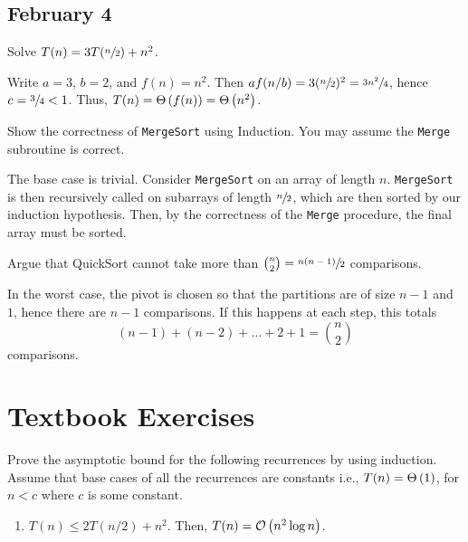 \documentclass[draft]{article}
\begin{document}
\subsection{February 4}
\begin{question}
    Solve $T(n) = 3T(\sfrac{n}{2}) + n^2$.
\end{question}

\begin{solution}
    Write $a = 3$, $b=2$, and $f(n) = n^2$. Then $af(n/b) = 3(\sfrac{n}{2})^2=\sfrac{3n^2}{4}$, hence $c =\sfrac{3}{4} < 1$. Thus, $T(n) = \Theta\left(f(n)\right) = \Theta\left(n^2\right)$.
\end{solution}

\begin{question}
    Show the correctness of \texttt{MergeSort} using Induction. You may assume the \texttt{Merge} subroutine is correct.
\end{question}

\begin{solution}
    The base case is trivial. Consider \texttt{MergeSort} on an array of length $n$. \texttt{MergeSort} is then recursively called on subarrays of length $\sfrac{n}{2}$, which are then sorted by our induction hypothesis. Then, by the correctness of the \texttt{Merge} procedure, the final array must be sorted.
\end{solution}

\begin{question}
    Argue that QuickSort cannot take more than $\binom{n}{2} = \sfrac{n(n - 1)}{2}$ comparisons.
\end{question}

\begin{solution}
    In the worst case, the pivot is chosen so that the partitions are of size $n - 1$ and $1$, hence there are $n - 1$ comparisons. If this happens at each step, this totals \[(n - 1) + (n - 2) + \dots + 2 + 1 = \binom{n}{2}\] comparisons.
\end{solution}

\section{Textbook Exercises}
\begin{exercise}{4.1}
    Prove the asymptotic bound for the following recurrences by using
    induction. Assume that base cases of all the recurrences are
    constants i.e., $ T(n) = \Theta\left(1\right)$, for $n < c$ where $c$ is some
    constant.
    \begin{enumerate}[label=(\alph*)]
        \item $T(n) \leq 2 T(n/2) + n^2$. Then, $T(n) = \mathcal{O}\left(n^2 \log n\right)$.
    \end{enumerate}
\end{exercise}
\end{document}
